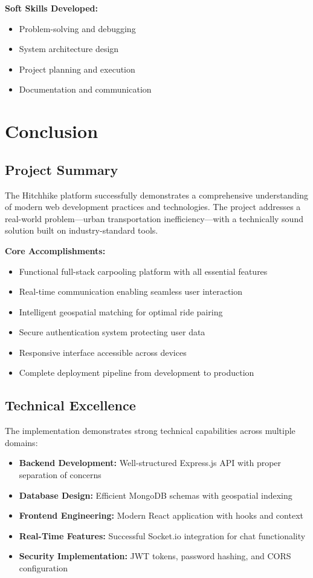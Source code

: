 \documentclass[12pt,a4paper]{article}
\begin{document}
\textbf{Soft Skills Developed:}
\begin{itemize}
    \item Problem-solving and debugging
    \item System architecture design
    \item Project planning and execution
    \item Documentation and communication
\end{itemize}

\newpage

\section{Conclusion}

\subsection{Project Summary}

The Hitchhike platform successfully demonstrates a comprehensive understanding of modern web development practices and technologies. The project addresses a real-world problem—urban transportation inefficiency—with a technically sound solution built on industry-standard tools.

\textbf{Core Accomplishments:}
\begin{itemize}
    \item Functional full-stack carpooling platform with all essential features
    \item Real-time communication enabling seamless user interaction
    \item Intelligent geospatial matching for optimal ride pairing
    \item Secure authentication system protecting user data
    \item Responsive interface accessible across devices
    \item Complete deployment pipeline from development to production
\end{itemize}

\subsection{Technical Excellence}

The implementation demonstrates strong technical capabilities across multiple domains:

\begin{itemize}
    \item \textbf{Backend Development:} Well-structured Express.js API with proper separation of concerns
    \item \textbf{Database Design:} Efficient MongoDB schemas with geospatial indexing
    \item \textbf{Frontend Engineering:} Modern React application with hooks and context
    \item \textbf{Real-Time Features:} Successful Socket.io integration for chat functionality
    \item \textbf{Security Implementation:} JWT tokens, password hashing, and CORS configuration
\end{itemize}
\end{document}
